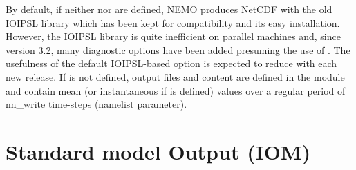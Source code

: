 By default, if neither  nor  are defined, NEMO produces NetCDF with the old IOIPSL library which has been kept for compatibility and its easy installation. However, the IOIPSL library is quite inefficient on parallel machines and, since version 3.2, many diagnostic options have been added presuming the use of . The usefulness of the default IOIPSL-based option is expected to reduce with each new release. If  is not defined, output files and content are defined in the  module and contain mean (or instantaneous if  is defined) values over a regular period of nn\_write time-steps (namelist parameter). 


\section{Standard model Output (IOM)}
\label{DIA_iom}


